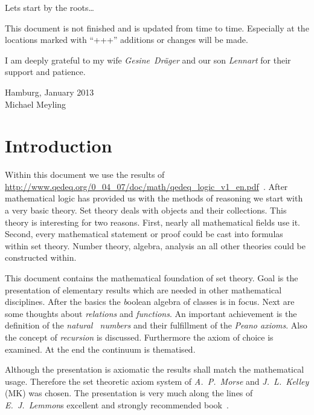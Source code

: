\documentclass[a4paper,german,10pt,twoside]{book}
\theoremstyle{definition}
\theoremstyle{remark}
\begin{document}
\par
Lets start by the roots\ldots

\par
This document is not finished and is updated from time to time. Especially at the locations marked with {``+++''} additions or changes will be made.

\par
I am deeply grateful to my wife \emph{Gesine~Dr{\"a}ger} and our son \emph{Lennart} for their support and patience.

\par
\vspace*{1cm} Hamburg, January 2013 \\
\hspace*{\fill} Michael Meyling


\chapter*{Introduction\label{ch:introduction}} \label{chapter2} \hypertarget{chapter2}{}

Within this document we use the results of \url{http://www.qedeq.org/0_04_07/doc/math/qedeq_logic_v1_en.pdf}~\cite{l}.
After mathematical logic has provided us with the methods of reasoning we start with a very basic theory. Set theory deals with objects and their collections. This theory is interesting for two reasons. First, nearly all mathematical fields use it. Second, every mathematical statement or proof could be cast into formulas within set theory. Number theory, algebra, analysis an all other theories could be constructed within.

\par          
This document contains the mathematical foundation of set theory. Goal is the presentation of elementary results which are needed in other mathematical disciplines. After the basics the {\emph boolean algebra of classes} is in focus. Next are some thoughts about \emph{relations} and \emph{functions}. An important achievement is the definition of the \emph{natural~ numbers} and their fulfillment of the \emph{Peano axioms}. Also the concept of \emph{recursion} is discussed. Furthermore the axiom of choice is examined. At the end the continuum is thematised.

\par
Although the presentation is axiomatic the results shall match the mathematical usage. Therefore the set theoretic axiom system of \emph{A.~P.~Morse} and \emph{J.~L.~Kelley} (MK) was chosen. The presentation is very much along the lines of \emph{E.~J.~Lemmon}s excellent and strongly recommended book~\cite{lemmon}.
\end{document}

